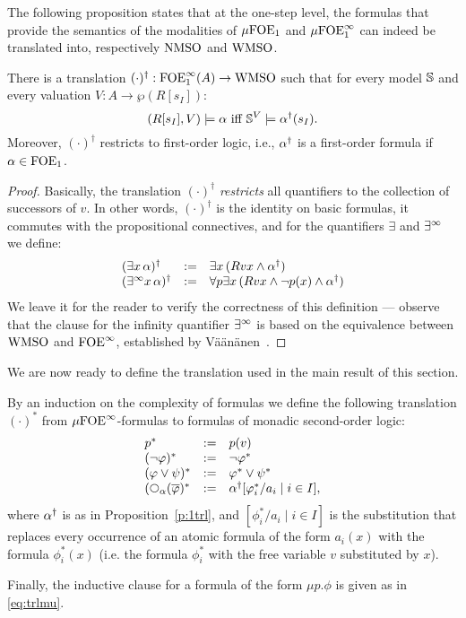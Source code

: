 The following proposition states that at the one-step level, the formulas that 
provide the semantics of the modalities of $\mu\mathrm{FOE}_1$ and $\mu\mathrm{FOE}^{\infty}_1$ can indeed 
be translated into, respectively $\mathrm{NMSO}$ and $\mathrm{WMSO}$.

\begin{proposition}
\label{p:1trl}
There is a translation $(\cdot)^{\dag}: \mathrm{FOE}^{\infty}_1(A) \to \mathrm{WMSO}$ such that for every 
model $\mathbb{S}$ and every valuation $V: A \to \wp(R[s_{I}])$:
\[
(R[s_{I}],V) \models \al \text{ iff } \model^{V} \models \al^{\dag}(s_{I}).
\]
Moreover, $(\cdot)^{\dag}$ restricts to first-order logic, i.e., $\alpha^{\dag}$ is
a first-order formula if $\alpha \in \mathrm{FOE}_1$.
\end{proposition}


\begin{proof}
Basically, the translation $(\cdot)^{\dag}$ \emph{restricts} all quantifiers
to the collection of successors of $v$.
In other words, $(\cdot)^{\dag}$ is the identity on basic formulas, it commutes
with the propositional connectives, and for the quantifiers $\exists$ and $\exists^\infty$
we define:
\[\begin{array}{lll}
(\exists x\, \alpha)^{\dag} &\mathrel{: =}& \exists x\, (Rvx \land \alpha^{\dag})
\\ (\exists^\infty x\, \alpha)^{\dag}  &\mathrel{: =}& \forall p \exists x\, (Rvx \land \neg p(x) 
    \land \alpha^{\dag})
\end{array}\]
We leave it for the reader to verify the correctness of this definition ---
observe that the clause for the infinity quantifier $\exists^\infty$ is based on the 
equivalence between $\mathrm{WMSO}$ and $\mathrm{FOE}^{\infty}$, established by 
V\"a\"an\"anen~\cite{vaananen77}.
\end{proof}

\noindent
We are now ready to define the translation used in the main result of this 
section.

\begin{definition}
By an induction on the complexity of formulas we define the following 
translation $(\cdot)^{*}$ from $\mu\mathrm{FOE}^{\infty}$-formulas to formulas of monadic 
second-order logic:
\[\begin{array}{lll}
   p^{*} &\df& p(v)
\\ (\neg\phi)^{*}        &\df& \neg \phi^{*}
\\ (\phi\lor\psi)^{*}    &\df& \phi^{*} \lor \psi^{*}
\\ (\nxt{\al}(\ol{\phi})^{*} &\df& \al^{\dag}[\phi_{i}^{*}/a_{i} \mid i \in I],
\end{array}\]
where $\alpha^{\dag}$ is as in Proposition~\ref{p:1trl}, and $[\phi_{i}^{*}/a_{i}
\mid i \in I]$ is the substitution that replaces every occurrence of an atomic
formula of the form $a_{i}(x)$ with the formula $\phi_{i}^{*}(x)$ (i.e. the 
formula $\phi_{i}^{*}$ with the free variable $v$ substituted by $x$).

Finally, the inductive clause for a formula of the form $\mu p.\phi$ is given
as in \eqref{eq:trlmu}.
\end{definition}

